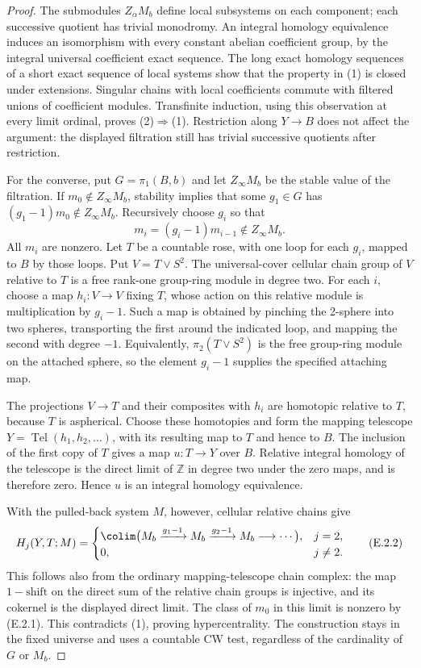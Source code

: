 \begin{proof}
The submodules $Z_\alpha M_b$ define local subsystems on each component;
each successive quotient has trivial monodromy. An integral homology
equivalence induces an isomorphism with every constant abelian
coefficient group, by the integral universal coefficient exact
sequence. The long exact homology sequences of a short exact sequence
of local systems show that the property in (1) is closed under
extensions. Singular chains with local coefficients commute with
filtered unions of coefficient modules. Transfinite induction,
using this observation at every limit ordinal, proves (2)$\Rightarrow$(1).
Restriction along $Y\to B$ does not affect the argument: the displayed
filtration still has trivial successive quotients after restriction.

For the converse, put $G=\pi_1(B,b)$ and let $Z_\infty M_b$ be the
stable value of the filtration. If $m_0\notin Z_\infty M_b$, stability
implies that some $g_1\in G$ has
$(g_1-1)m_0\notin Z_\infty M_b$. Recursively choose $g_i$ so that
\[
             m_i=(g_i-1)m_{i-1}\notin Z_\infty M_b.
             \tag{E.2.1}
\]
All $m_i$ are nonzero. Let $T$ be a countable rose, with one loop for
each $g_i$, mapped to $B$ by those loops. Put $V=T\vee S^2$.
The universal-cover cellular chain group of $V$ relative to $T$ is a
free rank-one group-ring module in degree two. For each $i$, choose
a map $h_i:V\to V$ fixing $T$, whose action on this relative module
is multiplication by $g_i-1$. Such a map is obtained by pinching the
2-sphere into two spheres, transporting the first around the indicated
loop, and mapping the second with degree $-1$. Equivalently,
$\pi_2(T\vee S^2)$ is the free group-ring module on the attached sphere,
so the element $g_i-1$ supplies the specified attaching map.

The projections $V\to T$ and their composites with $h_i$ are homotopic
relative to $T$, because $T$ is aspherical. Choose these homotopies and
form the mapping telescope $Y=\operatorname{Tel}(h_1,h_2,\ldots)$,
with its resulting map to $T$ and hence to $B$. The inclusion of the
first copy of $T$ gives a map $u:T\to Y$ over $B$. Relative integral
homology of the telescope is the direct limit of $\mathbb Z$ in
degree two under the zero maps, and is therefore zero. Hence $u$ is
an integral homology equivalence.

With the pulled-back system $M$, however, cellular relative chains
give
\[
 H_j(Y,T;M)=
 \begin{cases}
 \colim\bigl(M_b\xrightarrow{g_1-1}M_b
                 \xrightarrow{g_2-1}M_b\longrightarrow\cdots\bigr),&j=2,\\
 0,&j\ne2.
 \end{cases}                                                    \tag{E.2.2}
\]
This follows also from the ordinary mapping-telescope chain complex:
the map $1-\mathrm{shift}$ on the direct sum of the relative chain
groups is injective, and its cokernel is the displayed direct limit.
The class of $m_0$ in this limit is nonzero by (E.2.1). This
contradicts (1), proving hypercentrality. The construction stays in
the fixed universe and uses a countable CW test, regardless of the
cardinality of $G$ or $M_b$.


\end{proof}
